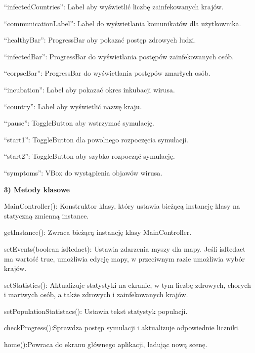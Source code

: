 \documentclass[a4paper]{article}
\begin{document}
\foreignlanguage{polish}{“infectedCountries”: Label aby wyświetlić liczbę zainfekowanych krajów.}

\foreignlanguage{polish}{“communicationLabel”: Label do wyświetlania komunikatów dla użytkownika.}

\foreignlanguage{polish}{“healthyBar”: ProgressBar aby pokazać postęp zdrowych ludzi.}

\foreignlanguage{polish}{“infectedBar”: ProgressBar do wyświetlania postępów zainfekowanych osób.}

\foreignlanguage{polish}{“corpseBar”: ProgressBar do wyświetlania postępów zmarłych osób.}

\foreignlanguage{polish}{“incubation”: Label aby pokazać okres inkubacji wirusa.}

\foreignlanguage{polish}{“country”: Label aby wyświetlić nazwę kraju.}

\foreignlanguage{polish}{“pause”: ToggleButton aby wstrzymać symulację.}

\foreignlanguage{polish}{“start1”: ToggleButton dla powolnego rozpoczęcia symulacji.}

\foreignlanguage{polish}{“start2”: ToggleButton aby szybko rozpocząć symulację.}

\foreignlanguage{polish}{“symptoms”: VBox do wystąpienia objawów wirusa.}


\bigskip

\foreignlanguage{polish}{\textbf{3) Metody klasowe}}

\foreignlanguage{polish}{MainController(): Konstruktor klasy, który ustawia bieżącą instancję klasy na statyczną zmienną
instance.}

\foreignlanguage{polish}{getInstance(): Zwraca bieżącą instancję klasy MainController.}

\foreignlanguage{polish}{setEvents(boolean isRedact): Ustawia zdarzenia myszy dla mapy. Jeśli isRedact ma wartość true,
umożliwia edycję mapy, w przeciwnym razie umożliwia wybór krajów.}

\foreignlanguage{polish}{setStatistics(): Aktualizuje statystyki na ekranie, w tym liczbę zdrowych, chorych i martwych
osób, a także zdrowych i zainfekowanych krajów.}

\foreignlanguage{polish}{setPopulationStatistacs(): Ustawia tekst statystyk populacji.}

\foreignlanguage{polish}{checkProgress():Sprawdza postęp symulacji i aktualizuje odpowiednie liczniki.}

\foreignlanguage{polish}{home():Powraca do ekranu głównego aplikacji, ładując nową scenę.}
\end{document}
